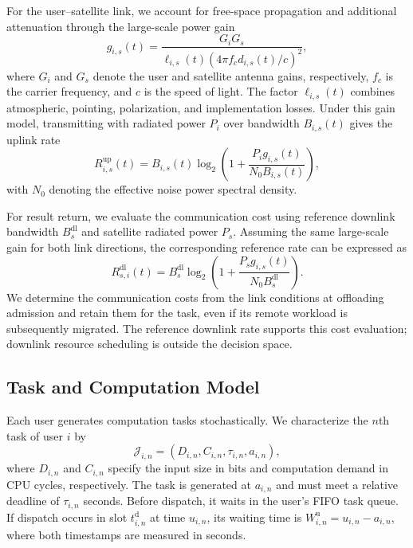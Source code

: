 \documentclass[journal]{IEEEtran}
\begin{document}
For the user--satellite link, we account for free-space
propagation and additional attenuation through the
large-scale power gain
\begin{equation}
g_{i,s}(t)=
\frac{G_iG_s}
{\ell_{i,s}(t)
 \left(4\pi f_c d_{i,s}(t)/c\right)^2},
\label{eq:channel_gain}
\end{equation}
where $G_i$ and $G_s$ denote the user and satellite
antenna gains, respectively, $f_c$ is the carrier frequency,
and $c$ is the speed of light. The factor $\ell_{i,s}(t)$
combines atmospheric, pointing, polarization, and
implementation losses. Under this gain model, transmitting
with radiated power $P_i$ over bandwidth $B_{i,s}(t)$
gives the uplink rate
\begin{equation}
R^{\mathrm{up}}_{i,s}(t)=
B_{i,s}(t)
\log_2\left(
1+\frac{P_i g_{i,s}(t)}
{N_0B_{i,s}(t)}
\right),
\label{eq:uplink_rate}
\end{equation}
with $N_0$ denoting the effective noise power spectral
density.

For result return, we evaluate the communication cost
using reference downlink bandwidth $B_s^{\mathrm{dl}}$
and satellite radiated power $P_s$. Assuming the same
large-scale gain for both link directions, the corresponding
reference rate can be expressed as
\begin{equation}
R^{\mathrm{dl}}_{s,i}(t)=
B_s^{\mathrm{dl}}
\log_2\left(
1+\frac{P_s g_{i,s}(t)}
{N_0B_s^{\mathrm{dl}}}
\right).
\label{eq:downlink_rate}
\end{equation}
We determine the communication costs from the link
conditions at offloading admission and retain them for
the task, even if its remote workload is subsequently
migrated. The reference downlink rate supports this
cost evaluation; downlink resource scheduling is outside
the decision space.

\subsection{Task and Computation Model}
\label{subsec:task_computation_model}

Each user generates computation tasks stochastically.
We characterize the $n$th task of user $i$ by
\begin{equation}
\mathcal{J}_{i,n}=
\left(D_{i,n},C_{i,n},\tau_{i,n},a_{i,n}\right),
\label{eq:task_definition}
\end{equation}
where $D_{i,n}$ and $C_{i,n}$ specify the input size
in bits and computation demand in CPU cycles, respectively.
The task is generated at $a_{i,n}$ and must meet a relative
deadline of $\tau_{i,n}$ seconds. Before dispatch, it
waits in the user's FIFO task queue. If dispatch occurs
in slot $t_{i,n}^{\mathrm d}$ at time $u_{i,n}$, its
waiting time is $W^{\mathrm u}_{i,n}=u_{i,n}-a_{i,n}$,
where both timestamps are measured in seconds.
\end{document}
